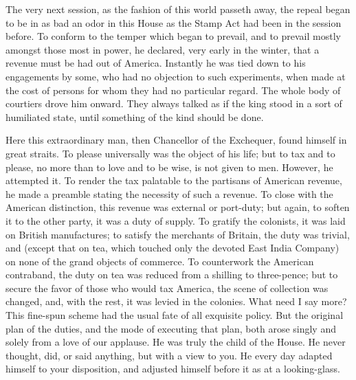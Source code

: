The very next session, as the fashion of this world passeth away, the repeal began to be in as bad an odor in this House as the Stamp Act had been in the session before. To conform to the temper which began to prevail, and to prevail mostly amongst those most in power, he declared, very early in the winter, that a revenue must be had out of America. Instantly he was tied down to his engagements by some, who had no objection to such experiments, when made at the cost of persons for whom they had no particular regard. The whole body of courtiers drove him onward. They always talked as if the king stood in a sort of humiliated state, until something of the kind should be done.

Here this extraordinary man, then Chancellor of the Exchequer, found himself in great straits. To please universally was the object of his life; but to tax and to please, no more than to love and to be wise, is not given to men. However, he attempted it. To render the tax palatable to the partisans of American revenue, he made a preamble stating the necessity of such a revenue. To close with the American distinction, this revenue was external or port-duty; but again, to soften it to the other party, it was a duty of supply. To gratify the colonists, it was laid on British manufactures; to satisfy the merchants of Britain, the duty was trivial, and (except that on tea, which touched only the devoted East India Company) on none of the grand objects of commerce. To counterwork the American contraband, the duty on tea was reduced from a shilling to three-pence; but to secure the favor of those who would tax America, the scene of collection was changed, and, with the rest, it was levied in the colonies. What need I say more? This fine-spun scheme had the usual fate of all exquisite policy. But the original plan of the duties, and the mode of executing that plan, both arose singly and solely from a love of our applause. He was truly the child of the House. He never thought, did, or said anything, but with a view to you. He every day adapted himself to your disposition, and adjusted himself before it as at a looking-glass.


